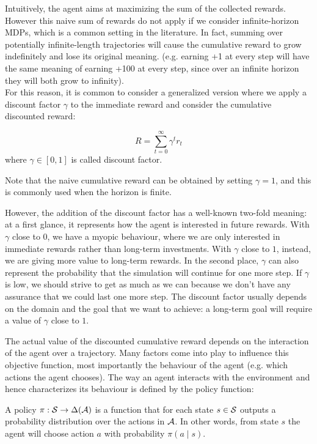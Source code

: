 Intuitively, the agent aims at maximizing the sum of the collected rewards. However this naive sum of rewards do not apply if we consider infinite-horizon MDPs, which is a common setting in the literature. In fact, summing over potentially infinite-length trajectories will cause the cumulative reward to grow indefinitely and lose its original meaning. (e.g. earning +1 at every step will have the same meaning of earning +100 at every step, since over an infinite horizon they will both grow to infinity).\\
For this reason, it is common to consider a generalized version where we apply a discount factor $\gamma$ to the immediate reward and consider the cumulative discounted reward:
\begin{definition}
\begin{equation*}
R = \sum_{t=0}^{\infty} \gamma^t r_t
\end{equation*}
where $\gamma \in [0,1]$ is called discount factor. 
\end{definition}
Note that the naive cumulative reward can be obtained by setting $\gamma=1$, and this is commonly used when the horizon is finite. 

However, the addition of the discount factor has a well-known two-fold meaning: at a first glance, it represents how the agent is interested in future rewards. With $\gamma$ close to $0$, we have a myopic behaviour, where we are only interested in immediate rewards rather than long-term investments. With $\gamma$ close to $1$, instead, we are giving more value to long-term rewards. In the second place, $\gamma$ can also represent the probability that the simulation will continue for one more step. If $\gamma$ is low, we should strive to get as much as we can because we don't have any assurance that we could last one more step.
The discount factor usually depends on the domain and the goal that we want to achieve: a long-term goal will require a value of $\gamma$ close to $1$.


The actual value of the discounted cumulative reward depends on the interaction of the agent over a trajectory. Many factors come into play to influence this objective function, most importantly the behaviour of the agent (e.g. which actions the agent chooses). The way an agent interacts with the environment and hence characterizes its behaviour is defined by the policy function:
\begin{definition}
A policy $\pi: \mathcal{S} \rightarrow \Delta (\mathcal{A})$ is a function that for each state $s \in \mathcal{S}$ outputs a probability distribution over the actions in $\mathcal{A}$. In other words, from state $s$ the agent will choose action $a$ with probability $\pi(a \mid s)$.
\end{definition}

